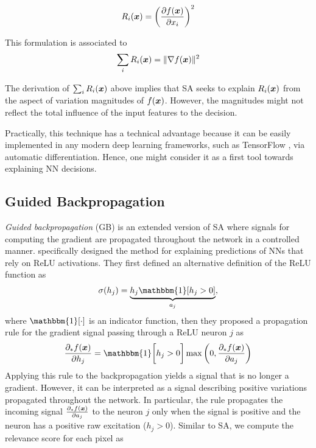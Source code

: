 \begin{align*}
	R_i(\x) =
	 \bigg( \frac{\partial f(\patvector{x})}{ \partial x_i } \bigg)^2
\end{align*}
	
This formulation is associated to
\begin{align*}
	\sum_i R_i(\x) = \| \nabla f(\patvector{x}) \|^2
\end{align*}

The derivation of $\sum_i R_i(\boldsymbol{x})$ above implies that SA seeks to explain $R_i(\boldsymbol{x})$ from the aspect of variation magnitudes of $f(\boldsymbol{x})$. However, the magnitudes might not reflect the total influence of the input features to the decision.

Practically, this technique has a technical advantage because it can be easily implemented in any modern deep learning frameworks, such as TensorFlow \citep{AbadiTensorFlowLargeScaleMachine2016}, via automatic differentiation. Hence, one might consider it as a first tool towards explaining NN decisions.

\subsection{Guided Backpropagation}
\textit{Guided backpropagation} (GB) is an extended version of SA where signals for computing the gradient are propagated throughout the network in a controlled manner. \citet{SpringenbergStrivingSimplicityAll2015a} specifically designed the method for explaining predictions of NNs that rely on ReLU activations.  They first defined an alternative definition  of the ReLU function as
\begin{align*}
	\sigma(h_j) = \underbrace{h_j \mathbbm{1}[ h_j > 0 ]}_{a_j},
\end{align*}
where $\mathbbm{1}[ \cdot ]$  is an indicator function, then they proposed a  propagation rule for the gradient signal passing through a ReLU neuron $j$ as
\begin{align*}
	\frac{\partial_* f(\patvector{x}) }{ \partial h_j } = \mathbbm{1}\bigg[h_j > 0 \bigg] \max \bigg(0, \frac{ \partial_* f(\patvector{x}) }{ \partial a_j } \bigg)
\end{align*}
Applying this rule to the backpropagation yields a signal that is no longer a gradient. However, it can be interpreted as a signal describing positive variations propagated throughout the network. In particular, the rule propagates the incoming signal $\frac{\partial_* f(\boldsymbol{x})}{\partial a_j}$ to the neuron $j$ only when the signal is positive and the neuron has a positive raw excitation ($h_j > 0$). Similar to SA, we compute the relevance score for each pixel  as 

